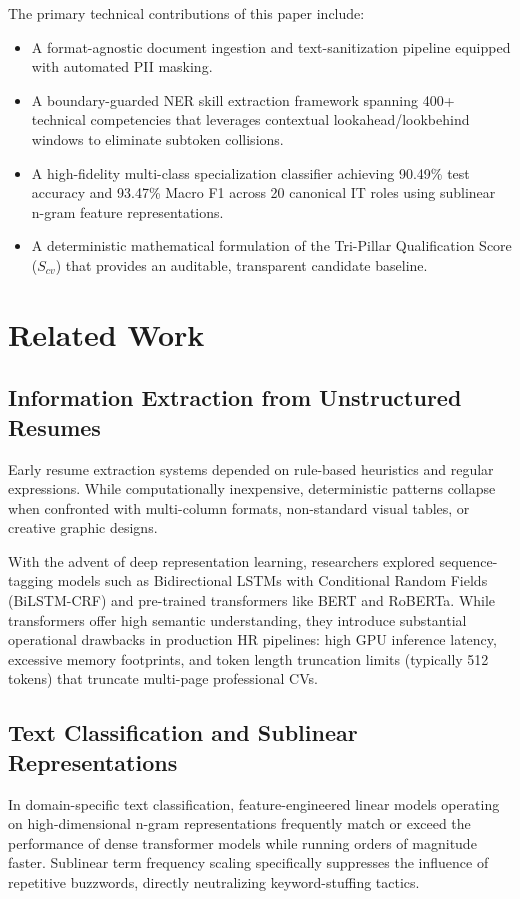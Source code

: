 \documentclass[conference]{IEEEtran}
\begin{document}
The primary technical contributions of this paper include:
\begin{itemize}
    \item A format-agnostic document ingestion and text-sanitization pipeline equipped with automated PII masking.
    \item A boundary-guarded NER skill extraction framework spanning 400+ technical competencies that leverages contextual lookahead/lookbehind windows to eliminate subtoken collisions.
    \item A high-fidelity multi-class specialization classifier achieving 90.49\% test accuracy and 93.47\% Macro F1 across 20 canonical IT roles using sublinear n-gram feature representations.
    \item A deterministic mathematical formulation of the Tri-Pillar Qualification Score ($S_{cv}$) that provides an auditable, transparent candidate baseline.
\end{itemize}

\section{Related Work}

\subsection{Information Extraction from Unstructured Resumes}
Early resume extraction systems depended on rule-based heuristics and regular expressions. While computationally inexpensive, deterministic patterns collapse when confronted with multi-column formats, non-standard visual tables, or creative graphic designs. 

With the advent of deep representation learning, researchers explored sequence-tagging models such as Bidirectional LSTMs with Conditional Random Fields (BiLSTM-CRF) and pre-trained transformers like BERT and RoBERTa. While transformers offer high semantic understanding, they introduce substantial operational drawbacks in production HR pipelines: high GPU inference latency, excessive memory footprints, and token length truncation limits (typically 512 tokens) that truncate multi-page professional CVs.

\subsection{Text Classification and Sublinear Representations}
In domain-specific text classification, feature-engineered linear models operating on high-dimensional n-gram representations frequently match or exceed the performance of dense transformer models while running orders of magnitude faster. Sublinear term frequency scaling specifically suppresses the influence of repetitive buzzwords, directly neutralizing keyword-stuffing tactics.
\end{document}
